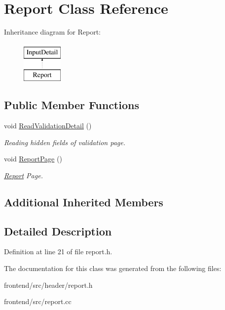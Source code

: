 \hypertarget{classReport}{\section{Report Class Reference}
\label{classReport}
}
Inheritance diagram for Report\-:\begin{figure}[H]
\begin{center}
\leavevmode
\includegraphics[height=2.000000cm]{da/da8/classReport}
\end{center}
\end{figure}
\subsection*{Public Member Functions}
\begin{DoxyCompactItemize}
\item 
\hypertarget{classReport_a4956ae80ad7ed501162a3a7345ccd2e8}{void \hyperlink{classReport_a4956ae80ad7ed501162a3a7345ccd2e8}{Read\-Validation\-Detail} ()}\label{classReport_a4956ae80ad7ed501162a3a7345ccd2e8}

\begin{DoxyCompactList}\small\item\em Reading hidden fields of validation page. \end{DoxyCompactList}\item 
\hypertarget{classReport_aa763587ca224dc7a1011c8e235937f24}{void \hyperlink{classReport_aa763587ca224dc7a1011c8e235937f24}{Report\-Page} ()}\label{classReport_aa763587ca224dc7a1011c8e235937f24}

\begin{DoxyCompactList}\small\item\em \hyperlink{classReport}{Report} Page. \end{DoxyCompactList}\end{DoxyCompactItemize}
\subsection*{Additional Inherited Members}


\subsection{Detailed Description}


Definition at line 21 of file report.\-h.



The documentation for this class was generated from the following files\-:\begin{DoxyCompactItemize}
\item 
frontend/src/header/report.\-h\item 
frontend/src/report.\-cc\end{DoxyCompactItemize}
